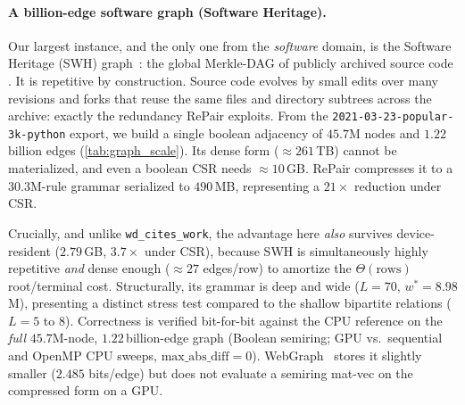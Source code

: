\documentclass[twoside,leqno,twocolumn]{article}
\begin{document}
\paragraph{A billion-edge software graph (Software Heritage).}

Our largest instance, and the only one from the \emph{software} domain, is the Software Heritage (SWH) graph~\cite{swh_dag}: the global Merkle-DAG of publicly archived source code \cite[\S2.1]{swh-ecosystems-book}\cite{swh_cacm,di-cosmo-archiving}. It is repetitive by construction. Source code evolves by small edits over many revisions and forks that reuse the same files and directory subtrees across the archive: exactly the redundancy RePair exploits. From the \texttt{2021-03-23-popular-3k-python} export, we build a single boolean adjacency of $45.7$M nodes and $1.22$ billion edges (\cref{tab:graph_scale}). Its dense form ($\approx\!261$\,TB) cannot be materialized, and even a boolean CSR needs $\approx\!10$\,GB. RePair compresses it to a $30.3$M-rule grammar serialized to $490$\,MB, representing a $21\times$ reduction under CSR. 

Crucially, and unlike \texttt{wd\_cites\_work}, the advantage here \emph{also} survives device-resident ($2.79$\,GB, $3.7\times$ under CSR), because SWH is simultaneously highly repetitive \emph{and} dense enough ($\approx\!27$ edges/row) to amortize the $\Theta(\text{rows})$ root/terminal cost. Structurally, its grammar is deep and wide ($L=70$, $w^{*}=8.98$M), presenting a distinct stress test compared to the shallow bipartite relations ($L=5$ to $8$). Correctness is verified bit-for-bit against the CPU reference on the \emph{full} $45.7$M-node, $1.22$\,billion-edge graph (Boolean semiring; GPU vs.\ sequential and OpenMP CPU sweeps, $\text{max\_abs\_diff}=0$). WebGraph~\cite{webgraph,webgraph_rust} stores it slightly smaller ($2.485$ bits/edge) but does not evaluate a semiring mat-vec on the compressed form on a GPU.

\begin{table}[t]
\caption{Largest graph relations that bracket the compressibility spectrum: two Wikidata relations and the billion-edge Software Heritage software graph. REANS: serialized grammar; CSR / eng.\ dev.: analytic device footprint of cuSPARSE CSR and the engine; Bool: single-vector Boolean time (engine / cuSPARSE), GB10 node. Dense forms ($2.2$\,GB / $10.8$\,TB / $261$\,TB) are unusable.}
\label{tab:graph_scale}
\centering\footnotesize

\end{table}
\end{document}
